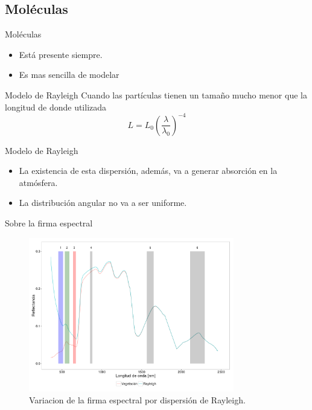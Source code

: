 \documentclass[handout]{beamer}
\begin{document}
\subsection{Moléculas}
\begin{frame}{Moléculas}
  \begin{itemize}
    \item Está presente siempre.
    \item Es mas sencilla de modelar
  \end{itemize}
\end{frame}
\begin{frame}{Modelo de Rayleigh}
  Cuando las partículas tienen un tamaño mucho menor que la longitud de donde utilizada
  \begin{equation}
    L = L_0 \left( \frac{\lambda}{\lambda_0} \right)^{-4}
  \end{equation}
\end{frame}

\begin{frame}{Modelo de Rayleigh}
  \begin{itemize}[<+->]
    \item La existencia de esta dispersión, además, va a generar absorción en la atmósfera.
    \item La distribución angular no va a ser uniforme.
  \end{itemize}
\end{frame}

\begin{frame}{Sobre la firma espectral}
  \begin{figure}
  \centering
  \includegraphics[width=0.8\textwidth]{imagenes/rayleigh.png}
  \caption{Variacion de la firma espectral por dispersión de Rayleigh. }
  \end{figure}
\end{frame}
\end{document}
